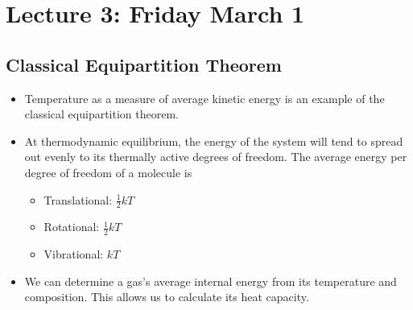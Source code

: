 \documentclass[8pt]{article}
\begin{document}
\section{Lecture 3: Friday March 1}
\subsection{Classical Equipartition Theorem}
\begin{itemize}
    \item Temperature as a measure of average kinetic energy is an example of the classical equipartition theorem. 
    \item At thermodynamic equilibrium, the energy of the system will tend to spread out evenly to its thermally active degrees of freedom. The average energy per degree of freedom of a molecule is 
    \begin{itemize}
        \item Translational: $\frac{1}{2}kT$
        \item Rotational: $\frac{1}{2}kT$
        \item Vibrational: $kT$
    \end{itemize}
    \item We can determine a gas's average internal energy from its temperature and composition. This allows us to calculate its heat capacity. 

\end{itemize}
\end{document}
